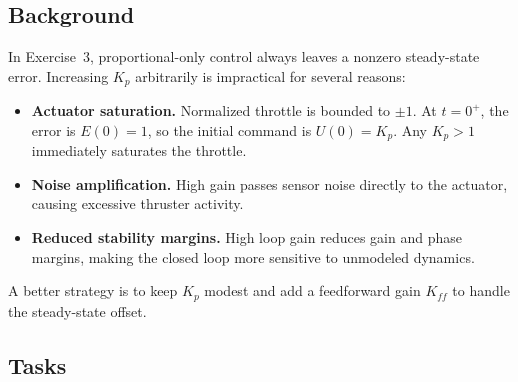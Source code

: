 \documentclass[11pt]{article}
\begin{document}
\subsection*{Background}

In Exercise~3, proportional-only control always leaves a nonzero steady-state
error.
Increasing $K_p$ arbitrarily is impractical for several reasons:

\begin{itemize}
  \item \textbf{Actuator saturation.}  Normalized throttle is bounded to
        $\pm 1$.  At $t=0^+$, the error is $E(0)=1$, so the initial command is
        $U(0) = K_p$.  Any $K_p > 1$ immediately saturates the throttle.
  \item \textbf{Noise amplification.}  High gain passes sensor noise directly
        to the actuator, causing excessive thruster activity.
  \item \textbf{Reduced stability margins.}  High loop gain reduces gain and
        phase margins, making the closed loop more sensitive to unmodeled
        dynamics.
\end{itemize}

A better strategy is to keep $K_p$ modest and add a feedforward gain $K_{ff}$
to handle the steady-state offset.

\subsection*{Tasks}
\end{document}
